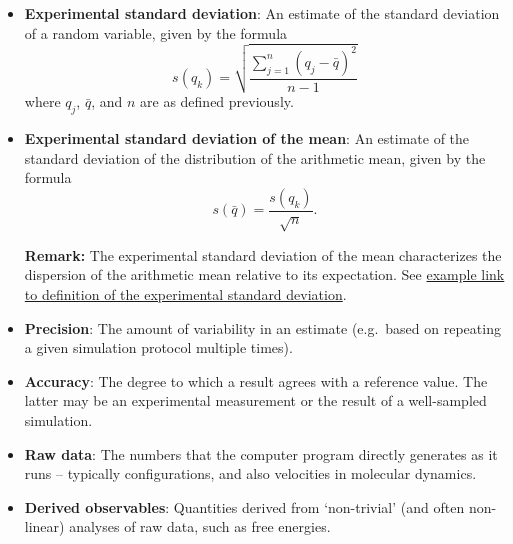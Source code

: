 \begin{itemize}
\item {\bf Experimental standard deviation}: An estimate of the standard deviation of a random variable, given by the formula
  \begin{equation}
    s\left(q_k\right) = \sqrt{\dfrac{\sum_{j=1}^n\left(q_j - \bar{q}\right)^2}{n-1}} \label{def:exp_st_dev}
  \end{equation}
  where $q_j$, $\bar{q}$, and $n$ are as defined previously. 
  
\item {\bf Experimental standard deviation of the mean}: An estimate of the standard deviation of the distribution of the arithmetic mean, given by the formula
  \begin{equation}
    s\left(\bar{q}\right) = \dfrac{s\left(q_k\right)}{\sqrt{n}}. \label{def:exp_st_dev_mean}
  \end{equation}
  
  \medskip
  
  {\bf Remark:}  The experimental standard deviation of the mean characterizes the dispersion of the arithmetic mean relative to its expectation.  See \hyperref[def:exp_st_dev]{example link to definition of the experimental standard deviation}.
  
\item {\bf Precision}: The amount of variability in an estimate (e.g.\ based on repeating a given simulation protocol multiple times).  %
  
  
\item {\bf Accuracy}: The degree to which a result agrees with a reference value.  The latter may be an experimental measurement or the result of a well-sampled simulation.  
  
\item {\bf Raw data}: The numbers that the computer program directly generates as it runs -- typically configurations, and also velocities in molecular dynamics.  
  
\item {\bf Derived observables}: Quantities derived from `non-trivial' (and often non-linear) analyses of raw data, such as free energies.


\end{itemize}
